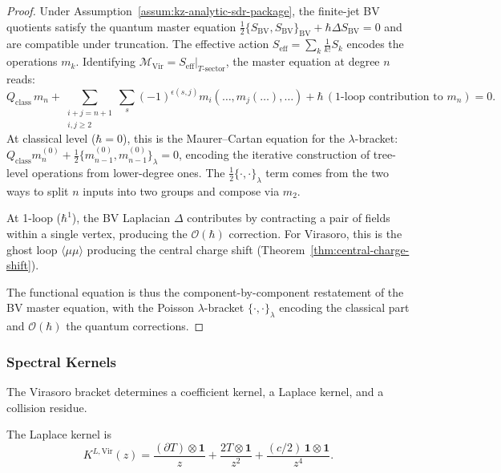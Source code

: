 \begin{proof}
Under Assumption~\ref{assum:kz-analytic-sdr-package}, the finite-jet
BV quotients satisfy the quantum master equation
$\tfrac{1}{2}\{S_{\mathrm{BV}}, S_{\mathrm{BV}}\}_{\mathrm{BV}}
+ \hbar\Delta S_{\mathrm{BV}} = 0$ and are compatible under
truncation. The effective action
$S_{\mathrm{eff}} = \sum_k \frac{1}{k!} S_k$ encodes the operations
$m_k$. Identifying
$\mathcal{M}_{\mathrm{Vir}} = S_{\mathrm{eff}}|_{T\text{-sector}}$,
the master equation at degree $n$ reads:
\[
Q_{\mathrm{class}}\, m_n + \sum_{\substack{i+j=n+1\\i,j\ge 2}} \sum_{s} (-1)^{\epsilon(s,j)} m_i(\ldots, m_j(\ldots), \ldots) + \hbar\,(\text{1-loop contribution to } m_n) = 0.
\]
At classical level ($\hbar = 0$), this is the Maurer--Cartan equation for the $\lambda$-bracket: $Q_{\mathrm{class}} m_n^{(0)} + \frac{1}{2}\{m_{n-1}^{(0)}, m_{n-1}^{(0)}\}_\lambda = 0$, encoding the iterative construction of tree-level operations from lower-degree ones. The $\frac{1}{2}\{\cdot, \cdot\}_\lambda$ term comes from the two ways to split $n$ inputs into two groups and compose via $m_2$.

At 1-loop ($\hbar^1$), the BV Laplacian $\Delta$ contributes by contracting a pair of fields within a single vertex, producing the $\mathcal{O}(\hbar)$ correction. For Virasoro, this is the ghost loop $\langle\mu\mu\rangle$ producing the central charge shift (Theorem~\ref{thm:central-charge-shift}).

The functional equation is thus the component-by-component restatement of the BV master equation, with the Poisson $\lambda$-bracket $\{\cdot, \cdot\}_\lambda$ encoding the classical part and $\mathcal{O}(\hbar)$ the quantum corrections.
\end{proof}

\subsubsection{Spectral Kernels}

The Virasoro bracket determines a coefficient kernel, a Laplace
kernel, and a collision residue.

\begin{definition}
The Laplace kernel is
\begin{equation}
K^{L,\text{Vir}}(z)
=
\frac{(\partial T)\otimes\mathbf{1}}{z}
+\frac{2T\otimes\mathbf{1}}{z^2}
+\frac{(c/2)\,\mathbf{1}\otimes\mathbf{1}}{z^4}.
\end{equation}
\end{definition}

